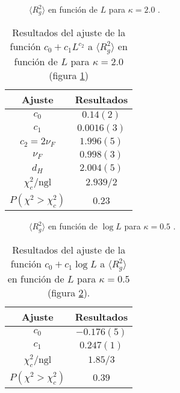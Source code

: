 \begin{figure}[h]
  \centering
  
  \caption{$\langle R^2_g \rangle$ en función de $L$ para $\kappa=2.0$ .}\label{Rg2_plana-fig}
\end{figure}

\begin{table}[h]
\centering
\begin{tabular}{|c|c|}\hline
 Ajuste              & Resultados \\ \hline\hline
 $c_0$               & $0.14(2) $  \\ \hline
 $c_1$               & $0.0016(3)$ \\ \hline
 $c_2=2\nu_F$        &  $1.996(5)$ \\ \hline
 $\nu_F$             & $ 0.998(3)$ \\ \hline
$ d_H$               & $ 2.004(5)$ \\ \hline
$\chi_c^2/\mathrm{ngl}$        &  $2.939/2$  \\ \hline
 $P(\chi^2>\chi_c^2)$&  $0.23$    \\ \hline
\end{tabular}
\caption{Resultados del ajuste de la función $c_0+c_1L^{c_2}$ a $\langle R^2_g
  \rangle$ en función de $L$ para $\kappa=2.0$ (figura \ref{Rg2_plana-fig})}\label{Rg2_plana-tab}
\end{table}
\clearpage

\begin{figure}[h]
  \centering
  
   \caption{$\langle R^2_g \rangle$ en función de $\log L$ para $\kappa=0.5$ .}\label{rg2_rugosa-fig}
\end{figure}

\begin{table}[h]
\centering
\begin{tabular}{|c|c|}\hline
 Ajuste              & Resultados \\ \hline\hline
 $c_0$               & $-0.176(5) $  \\ \hline
 $c_1$               & $0.247(1)$ \\ \hline
 $\chi_c^2/\mathrm{ngl}$       &  $1.85/3$  \\ \hline
 $P(\chi^2>\chi_c^2)$&  $0.39$    \\ \hline
\end{tabular}
\caption{Resultados del ajuste de la función $c_0+c_1\log L$ a $\langle R^2_g
  \rangle$ en función de $L$ para $\kappa=0.5$ (figura \ref{rg2_rugosa-fig}).}\label{rg2_rugosa-tab}
\end{table}

